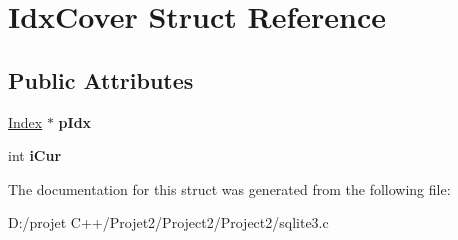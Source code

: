 \hypertarget{struct_idx_cover}{}\section{Idx\+Cover Struct Reference}
\label{struct_idx_cover}
\subsection*{Public Attributes}
\begin{DoxyCompactItemize}
\item 
\mbox{\label{struct_idx_cover_a5ccfb55ea6898b63aee5626a6ee5365e}} 
\mbox{\hyperlink{struct_index}{Index}} $\ast$ {\bfseries p\+Idx}
\item 
\mbox{\label{struct_idx_cover_ab7d59e1b07eecac9aaf9bcd9f7d8edc0}} 
int {\bfseries i\+Cur}
\end{DoxyCompactItemize}


The documentation for this struct was generated from the following file\+:\begin{DoxyCompactItemize}
\item 
D\+:/projet C++/\+Projet2/\+Project2/\+Project2/sqlite3.\+c\end{DoxyCompactItemize}
